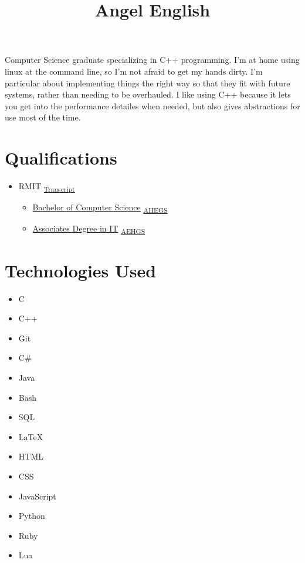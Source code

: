 \documentclass{amsart}
\title{Angel English}
\theoremstyle{definition} %
\begin{document}
\maketitle

Computer Science graduate specializing in C++ programming.
I'm at home using linux at the command line, so I'm not afraid to get
my hands dirty. I'm particular about implementing things the right
way so that they fit with future systems, rather than needing to be
overhauled. I like using C++ because it lets you get into the
performance detailes when needed, but also gives abstractions for
use most of the time.

\section{Qualifications}

\begin{itemize}
	\item
		RMIT
		\textsubscript{
			\href{https://www.myequals.net/sharelink/9ea57606-24b8-45e4-8030-4db56b0bee20/1c373231-4325-435c-b587-dab0f3481f64}{Transcript}
		}
		\begin{itemize}
			\item
				\href{https://www.myequals.net/sharelink/772babfa-f554-43b1-af4c-294eecf0b1df/f43434a3-e222-4b80-a4d9-2513723adb43}{Bachelor of Computer Science}
				\textsubscript{
					\href{https://www.myequals.net/sharelink/0ca660ab-7f1b-42fd-861b-e9b03df80363/0f37473b-f685-41bb-abd6-98d1e9dd7fb0}{AHEGS}
				}
			\item
				\href{https://www.myequals.net/sharelink/46bae55d-6a51-42f2-a6d3-ad1b9bab7f02/3dc307bb-09b1-43f1-b319-ee16fa643d2f}{Associates Degree in IT}
				\textsubscript{
					\href{https://www.myequals.net/sharelink/9ca4d745-4601-416f-a0fd-5c7334088e4a/49e877ab-89ee-4c36-a9d1-fd9f9911dc0a}{AEHGS}
				}
		\end{itemize}
\end{itemize}

\section{Technologies Used}

\begin{itemize}
	\item C
	\item C++
	\item Git
	\item C\#
	\item Java
	\item Bash
	\item SQL
	\item \LaTeX
	\item HTML
	\item CSS
	\item JavaScript
	\item Python
	\item Ruby
	\item Lua
\end{itemize}
\end{document}
